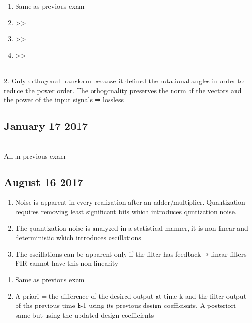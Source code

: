 \documentclass[
  a4paper,
  ,captions=tableheading
]{scrartcl}
\providecommand{\tightlist}{%
  \setlength{\itemsep}{0pt}\setlength{\parskip}{0pt}}
\begin{document}
\begin{enumerate}
\def\labelenumi{\arabic{enumi}.}
\tightlist
\item
  Same as previous exam\\
\item
  \textgreater\textgreater{}\\
\item
  \textgreater\textgreater{}\\
\item
  \textgreater\textgreater{}
\end{enumerate}

\strut \\
2. Only orthogonal transform because it defined the rotational angles in
order to reduce the power order. The orhogonality preserves the norm of
the vectors and the power of the input signals ⇒ lossless

\subsection{January 17 2017}\label{january-17-2017}

\strut \\
All in previous exam

\subsection{August 16 2017}\label{august-16-2017}

\begin{enumerate}
\def\labelenumi{\arabic{enumi}.}
\tightlist
\item
  Noise is apparent in every realization after an adder/multiplier.
  Quantization requires removing least significant bits which introduces
  quntization noise.\\
\item
  The quantization noise is analyzed in a statistical manner, it is non
  linear and deterministic which introduces oscillations\\
\item
  The oscillations can be apparent only if the filter has feedback ⇒
  linear filters FIR cannot have this non-linearity
\end{enumerate}

\begin{enumerate}
\def\labelenumi{\arabic{enumi}.}
\tightlist
\item
  Same as previous exam\\
\item
  A priori = the difference of the desired output at time k and the
  filter output of the previous time k-1 using its previous design
  coefficients. A posteriori = same but using the updated design
  coefficients
\end{enumerate}
\end{document}
